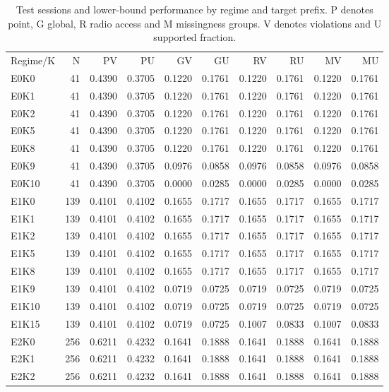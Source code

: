 \begin{table}[!ht]
\centering\small
\caption{Test sessions and lower-bound performance by regime and target prefix. P denotes point, G global, R radio access and M missingness groups. V denotes violations and U supported fraction.}
\begin{tabular}{lrrrrrrrrr}
\hline
Regime/K & N & PV & PU & GV & GU & RV & RU & MV & MU \\
E0K0 & 41 & 0.4390 & 0.3705 & 0.1220 & 0.1761 & 0.1220 & 0.1761 & 0.1220 & 0.1761 \\
E0K1 & 41 & 0.4390 & 0.3705 & 0.1220 & 0.1761 & 0.1220 & 0.1761 & 0.1220 & 0.1761 \\
E0K2 & 41 & 0.4390 & 0.3705 & 0.1220 & 0.1761 & 0.1220 & 0.1761 & 0.1220 & 0.1761 \\
E0K5 & 41 & 0.4390 & 0.3705 & 0.1220 & 0.1761 & 0.1220 & 0.1761 & 0.1220 & 0.1761 \\
E0K8 & 41 & 0.4390 & 0.3705 & 0.1220 & 0.1761 & 0.1220 & 0.1761 & 0.1220 & 0.1761 \\
E0K9 & 41 & 0.4390 & 0.3705 & 0.0976 & 0.0858 & 0.0976 & 0.0858 & 0.0976 & 0.0858 \\
E0K10 & 41 & 0.4390 & 0.3705 & 0.0000 & 0.0285 & 0.0000 & 0.0285 & 0.0000 & 0.0285 \\
E1K0 & 139 & 0.4101 & 0.4102 & 0.1655 & 0.1717 & 0.1655 & 0.1717 & 0.1655 & 0.1717 \\
E1K1 & 139 & 0.4101 & 0.4102 & 0.1655 & 0.1717 & 0.1655 & 0.1717 & 0.1655 & 0.1717 \\
E1K2 & 139 & 0.4101 & 0.4102 & 0.1655 & 0.1717 & 0.1655 & 0.1717 & 0.1655 & 0.1717 \\
E1K5 & 139 & 0.4101 & 0.4102 & 0.1655 & 0.1717 & 0.1655 & 0.1717 & 0.1655 & 0.1717 \\
E1K8 & 139 & 0.4101 & 0.4102 & 0.1655 & 0.1717 & 0.1655 & 0.1717 & 0.1655 & 0.1717 \\
E1K9 & 139 & 0.4101 & 0.4102 & 0.0719 & 0.0725 & 0.0719 & 0.0725 & 0.0719 & 0.0725 \\
E1K10 & 139 & 0.4101 & 0.4102 & 0.0719 & 0.0725 & 0.0719 & 0.0725 & 0.0719 & 0.0725 \\
E1K15 & 139 & 0.4101 & 0.4102 & 0.0719 & 0.0725 & 0.1007 & 0.0833 & 0.1007 & 0.0833 \\
E2K0 & 256 & 0.6211 & 0.4232 & 0.1641 & 0.1888 & 0.1641 & 0.1888 & 0.1641 & 0.1888 \\
E2K1 & 256 & 0.6211 & 0.4232 & 0.1641 & 0.1888 & 0.1641 & 0.1888 & 0.1641 & 0.1888 \\
E2K2 & 256 & 0.6211 & 0.4232 & 0.1641 & 0.1888 & 0.1641 & 0.1888 & 0.1641 & 0.1888 \\

\end{tabular}
\end{table}
